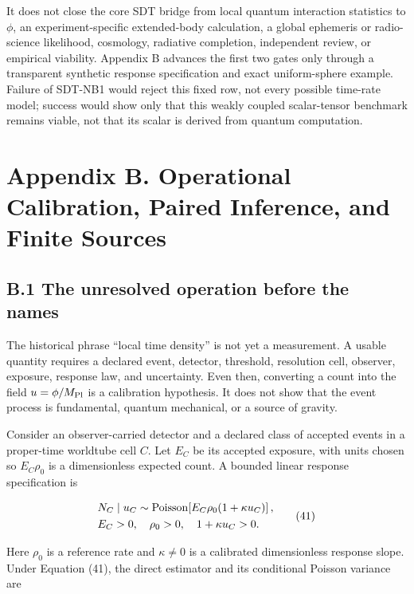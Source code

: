 \documentclass[
  american,
  11pt,
  letterpaper,
]{article}
\begin{document}
It does not close the core SDT bridge from local quantum interaction statistics to \(\phi\), an experiment-specific extended-body calculation, a global ephemeris or radio-science likelihood, cosmology, radiative completion, independent review, or empirical viability. Appendix B advances the first two gates only through a transparent synthetic response specification and exact uniform-sphere example. Failure of SDT-NB1 would reject this fixed row, not every possible time-rate model; success would show only that this weakly coupled scalar-tensor benchmark remains viable, not that its scalar is derived from quantum computation.

\section{Appendix B. Operational Calibration, Paired Inference, and Finite Sources}\label{appendix-b.-operational-calibration-paired-inference-and-finite-sources}

\subsection{B.1 The unresolved operation before the names}\label{b.1-the-unresolved-operation-before-the-names}

The historical phrase ``local time density'' is not yet a measurement. A usable quantity requires a declared event, detector, threshold, resolution cell, observer, exposure, response law, and uncertainty. Even then, converting a count into the field \(u=\phi/M_{\rm Pl}\) is a calibration hypothesis. It does not show that the event process is fundamental, quantum mechanical, or a source of gravity.

Consider an observer-carried detector and a declared class of accepted events in a proper-time worldtube cell \(C\). Let \(E_C\) be its accepted exposure, with units chosen so \(E_C\rho_0\) is a dimensionless expected count. A bounded linear response specification is

\begin{equation}
\begin{aligned}
& N_C\mid u_C\sim{\rm Poisson}\!\left[
E_C\rho_0(1+\kappa u_C)\right], \\
& E_C>0,\quad \rho_0>0,\quad 1+\kappa u_C>0.
\end{aligned}
\tag{41}
\end{equation}

Here \(\rho_0\) is a reference rate and \(\kappa\ne0\) is a calibrated dimensionless response slope. Under Equation (41), the direct estimator and its conditional Poisson variance are
\end{document}
